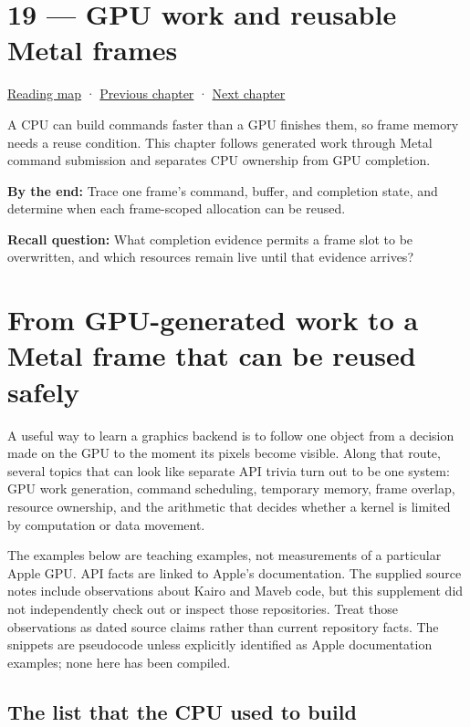 \hypertarget{05-engine-i-ch019}{}
\chapter{19 --- GPU work and reusable Metal frames}\label{05-engine-i-ch019-gpu-work-and-reusable-metal-frames}

\hyperref[volume-reading-map]{Reading map} · \hyperref[05-engine-i-ch018]{Previous chapter} · \hyperref[05-engine-i-ch020]{Next chapter}

A CPU can build commands faster than a GPU finishes them, so frame memory needs a reuse condition. This chapter follows generated work through Metal command submission and separates CPU ownership from GPU completion.

\textbf{By the end:} Trace one frame's command, buffer, and completion state, and determine when each frame-scoped allocation can be reused.

\textbf{Recall question:} What completion evidence permits a frame slot to be overwritten, and which resources remain live until that evidence arrives?

\chapter{From GPU-generated work to a Metal frame that can be reused safely}\label{05-engine-i-ch019-from-gpu-generated-work-to-a-metal-frame-that-can-be-reused-safely}

A useful way to learn a graphics backend is to follow one object from a decision made on the GPU to the moment its pixels become visible. Along that route, several topics that can look like separate API trivia turn out to be one system: GPU work generation, command scheduling, temporary memory, frame overlap, resource ownership, and the arithmetic that decides whether a kernel is limited by computation or data movement.

The examples below are teaching examples, not measurements of a particular Apple GPU. API facts are linked to Apple's documentation. The supplied source notes include observations about Kairo and Maveb code, but this supplement did not independently check out or inspect those repositories. Treat those observations as dated source claims rather than current repository facts. The snippets are pseudocode unless explicitly identified as Apple documentation examples; none here has been compiled.

\section{The list that the CPU used to build}\label{05-engine-i-ch019-the-list-that-the-cpu-used-to-build}

